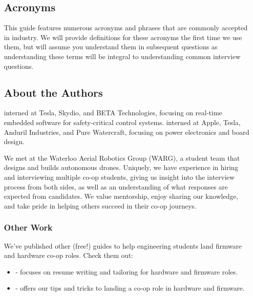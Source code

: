 \documentclass[main.tex]{subfiles}
\begin{document}
\subsection{Acronyms}
This guide features numerous acronyms and phrases that are commonly accepted in industry. We will provide definitions for these acronyms the first time we use them, but will assume you understand them in subsequent questions as understanding these terms will be integral to understanding common interview questions. 

\subsection{About the Authors}
 interned at Tesla, Skydio, and BETA Technologies, focusing on real-time embedded software for safety-critical control systems.
\newline
\newline
{} interned at Apple, Tesla, Anduril Industries, and Pure Watercraft, focusing on power electronics and board design. \newline

\newnoindentpara We met at the Waterloo Aerial Robotics Group (WARG), a student team that designs and builds autonomous drones. Uniquely, we have experience in hiring and interviewing multiple co-op students, giving us insight into the interview process from both sides, as well as an understanding of what responses are expected from candidates. We value mentorship, enjoy sharing our knowledge, and take pride in helping others succeed in their co-op journeys.

\subsubsection{Other Work}
We've published other (free!) guides to help engineering students land firmware and hardware co-op roles. Check them out:
\begin{itemize}
    \item {} - focuses on resume writing and tailoring for hardware and firmware roles.
    \item {} - offers our tips and tricks to landing a co-op role in hardware and firmware.
\end{itemize}
\end{document}
